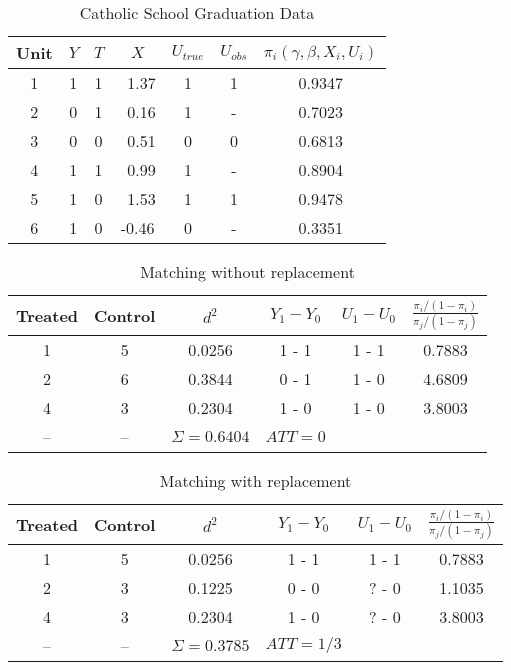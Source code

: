 \documentclass{article}
\begin{document}
\begin{itemize}
\begin{table}[!h]
		\caption{Catholic School Graduation Data}
	\begin{center}
		\begin{tabular}{cccc|cc|c}
                  Unit & $Y$ & $T$ & $X$ & $U_{true}$ & $U_{obs}$ & $\pi_i(\gamma,\beta,X_i,U_i)$\\ \hline  
                  1    & 1     & 1   &\ 1.37   & 1   & 1  & 0.9347\\ 
                  2    & 0     & 1   &\ 0.16   & 1    & - & 0.7023\\ 
                  3    & 0    &  0    &\ 0.51   & 0   & 0 & 0.6813\\ 
                  4    & 1    &  1    &\ 0.99   & 1  & -  &0.8904\\ 
                  5   &  1    &  0    &\ 1.53   & 1   & 1 &0.9478\\ 
                  6  &  1     &  0     &-0.46   & 0  & - &0.3351\\ 

		\end{tabular}
		\label{}
	\end{center}
\end{table}

\begin{table}[!h]
		\caption{Matching without replacement}
	\begin{center}
		\begin{tabular}{cccc|cc}
                  Treated & Control & $d^2$ & $Y_1 - Y_0$ & $U_1 - U_0$ & $\frac{\pi_i/(1-\pi_i)}{\pi_j/(1-\pi_j)}$ \\ \hline
                  1           & 5           & 0.0256   &1 - 1 &1 - 1 & 0.7883\\ 
                  2           & 6           & 0.3844   & 0 - 1  &1 - 0 & 4.6809 \\
                  4           & 3           & 0.2304    & 1 - 0 &1 - 0  & 3.8003                  \\
          \hline
                  -- & -- & $\Sigma = 0.6404$ & $ATT=0$ &
		\end{tabular}
		\label{}
	\end{center}
\end{table}

\begin{table}[h!!!!!!!]
		\caption{Matching with replacement}
	\begin{center}
		\begin{tabular}{cccc|cc}
                  Treated & Control & $d^2$ & $Y_1 - Y_0$ & $U_1 - U_0$& $\frac{\pi_i/(1-\pi_i)}{\pi_j/(1-\pi_j)}$ \\ \hline
                  1           & 5           & 0.0256   &1 - 1 &1 - 1 & 0.7883\\ 
                  2           & 3           & 0.1225   & 0 - 0 &? - 0  & 1.1035 \\
                  4           & 3           & 0.2304    & 1 - 0 &? - 0  & 3.8003\\
                  \hline
                  -- & -- & $\Sigma = 0.3785$ & $ATT=1/3$
                   

\end{tabular}
\end{center}
\end{table}
\end{itemize}
\end{document}
